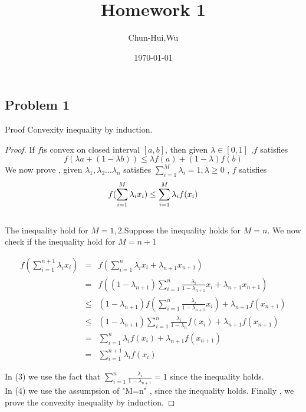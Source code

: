 \documentclass{article}
\title{Homework 1}
\author{Chun-Hui,Wu}
\date\today
\begin{document}
\maketitle %



\subsection*{Problem 1}
Proof Convexity inequality by induction.
\begin{proof}
If $f$is convex on closed interval $\left[ a,b\right]$, then given $\lambda \in \left[ 0,1\right]$ ,$f$ satisfies $$f(\lambda a+(1-\lambda b))\leq \lambda f(a) + (1-\lambda)f(b)$$
We now prove , given $\lambda_{1},\lambda_{2}...\lambda_{n} $ satisfies $\sum_{i=1}^{M}\lambda_{i}=1 , \lambda \geq 0$ , $f$ satisfies \\[5pt] $$f(\sum_{i=1}^{M}\lambda_{i}x_{i}) \leq \sum_{i=1}^{M}\lambda_{i}f(x_{i})\\$$\\[5pt]
The inequality hold for $M=1,2$.Suppose the inequality holds for $M=n$.
We now check if the inequality hold for $M=n+1$

\begin{eqnarray}
   f(\sum_{i=1}^{n+1}\lambda_{i}x_{i})&=& f(\sum_{i=1}^{n}\lambda_{i}x_{i}+\lambda_{n+1}x_{n+1})\\
   	                                  &=& f((1-\lambda_{n+1})\sum_{i=1}^{n}\frac{\lambda_{i}}{1-\lambda_{n+1}}x_{i}+\lambda_{n+1}x_{n+1})\\
                                      &\leq& (1-\lambda_{n+1}) f(\sum_{i=1}^{n}\frac{\lambda_{i}}{1-\lambda_{n+1}}x_{i})+\lambda_{n+1}f(x_{n+1})\\ 
                                      &\leq& (1-\lambda_{n+1}) \sum_{i=1}^{n}\frac{\lambda_{i}}{1-\lambda_{n}}f(x_{i})+\lambda_{n+1}f(x_{n+1})\\
                                      &=& \sum_{i=1}^{n}\lambda_{i}f(x_{i})+\lambda_{n+1}f(x_{n+1})\\
                                      &=& \sum_{i=1}^{n+1}\lambda_{i}f(x_{i})
\end{eqnarray}

In (3) we use the fact that $\sum_{i=1}^{n}\frac{\lambda_{i}}{1-\lambda_{n+1}}=1$ since the inequality holds.\\
In (4) we use the assumpsion of "M=n" , since the inequality holds.
Finally , we prove the convexity inequality by induction.

\end{proof}
\end{document}
